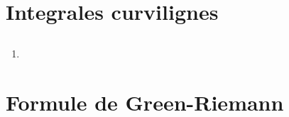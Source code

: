 \documentclass[12pt, class=report,crop=false]{standalone}
\begin{document}
\section{Integrales curvilignes}

\subsection{}


\subsection{}


\subsection{}


\subsection{}
 
 
\begin{miniexercices}
\sauteligne
\begin{enumerate}
  \item 
\end{enumerate}
\end{miniexercices}



\section{Formule de Green-Riemann}

\subsection{}


\subsection{}
\end{document}
